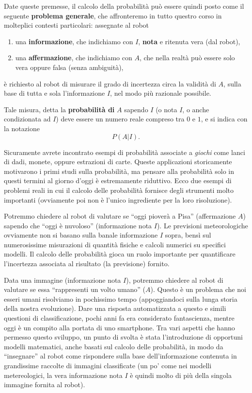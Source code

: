 \documentclass[
  italian,
  letterpaper,
]{book}
\providecommand{\tightlist}{%
  \setlength{\itemsep}{0pt}\setlength{\parskip}{0pt}}
\theoremstyle{definition}
\theoremstyle{remark}
\begin{document}
Date queste premesse, il calcolo della probabilità può essere quindi
posto come il seguente \textbf{problema generale}, che affronteremo in
tutto questro corso in molteplici contesti particolari: assegnate al
robot

\begin{enumerate}
\def\labelenumi{\arabic{enumi}.}
\tightlist
\item
  una \textbf{informazione}, che indichiamo con \(I\), \textbf{nota} e
  ritenuta vera (dal robot),
\item
  una \textbf{affermazione}, che indichiamo con \(A\), che nella realtà
  può essere solo vera oppure falsa (senza ambiguità),
\end{enumerate}

è richiesto al robot di misurare il grado di incertezza circa la
validità di \(A\), sulla base di tutta e sola l'informazione \(I\), nel
modo più razionale possibile.

Tale misura, detta la \textbf{probabilità di} \(A\) sapendo \(I\) (o
nota \(I\), o anche condizionata ad \(I\)) deve essere un numero reale
compreso tra \(0\) e \(1\), e si indica con la notazione \[ P(A | I).\]

Sicuramente avrete incontrato esempi di probabilità associate a
\emph{giochi} come lanci di dadi, monete, oppure estrazioni di carte.
Queste applicazioni storicamente motivarono i primi studi sulla
probabilità, ma pensare alla probabilità solo in questi termini al
giorno d'oggi è estremamente riduttivo. Ecco due esempi di problemi
reali in cui il calcolo delle probabilità fornisce degli strumenti molto
importanti (ovviamente poi non è l'unico ingrediente per la loro
risoluzione).

Potremmo chiedere al robot di valutare se ``oggi pioverà a Pisa''
(affermazione \(A\)) sapendo che ``oggi è nuvoloso'' (informazione nota
\(I\)). Le previsioni meteorologiche ovviamente non si basano sulla
banale informazione \(I\) sopra, bensì sul numerosissime misurazioni di
quantità fisiche e calcoli numerici su specifici modelli. Il calcolo
delle probabilità gioca un ruolo importante per quantificare
l'incertezza associata al risultato (la previsione) fornito.

Data una immagine (informazione nota \(I\)), potremmo chiedere al robot
di valutare se essa ``rappresenti un volto umano'' (\(A\)). Questo è un
problema che noi esseri umani risolviamo in pochissimo tempo
(appoggiandoci sulla lunga storia della nostra evoluzione). Dare una
risposta automatizzata a questo e simili questioni di classificazione,
pochi anni fa era considerato fantascienza, mentre oggi è un compito
alla portata di uno smartphone. Tra vari aspetti che hanno permesso
questo sviluppo, un punto di svolta è stata l'introduzione di opportuni
modelli matematici, anche basati sul calcolo delle probabilità, in modo
da ``insegnare'' al robot come rispondere sulla base dell'informazione
contenuta in grandissime raccolte di immagini classificate (un po' come
nei modelli metereologici, la vera informazione nota \(I\) è quindi
molto di più della singola immagine fornita al robot).
\end{document}
